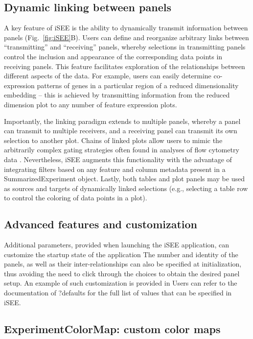\documentclass[10pt,a4paper,twocolumn]{article}
\begin{document}
\subsection*{Dynamic linking between panels}
A key feature of iSEE is the ability to dynamically transmit information between panels (Fig.~\ref{fig:iSEE}B).
Users can define and reorganize arbitrary links between ``transmitting'' and ``receiving'' panels, whereby selections in transmitting panels control the inclusion and appearance of the corresponding data points in receiving panels.
This feature facilitates exploration of the relationships between different aspects of the data.
For example, users can easily determine co-expression patterns of genes in a particular region of a reduced dimensionality embedding -- this is achieved by transmitting information from the reduced dimension plot to any number of feature expression plots.

Importantly, the linking paradigm extends to multiple panels, whereby a panel can transmit to multiple receivers, and a receiving panel can transmit its own selection to another plot.
Chains of linked plots allow users to mimic the arbitrarily complex gating strategies often found in analyses of flow cytometry data \citep{finak2014opencyto}.
Nevertheless, iSEE augments this functionality with the advantage of integrating filters based on any feature and column metadata present in a SummarizedExperiment object.
Lastly, both tables and plot panels may be used as sources and targets of dynamically linked selections (e.g., selecting a table row to control the coloring of data points in a plot).

\subsection*{Advanced features and customization}

Additional parameters, provided when launching the iSEE application, can customize the startup state of the application
The number and identity of the panels, as well as their inter-relationships can also be specified at initialization, thus avoiding the need to click through the choices to obtain the desired panel setup.
An example of such customization is provided in %
Users can refer to the documentation of ?defaults for the full list of values that can be specified in iSEE.


\subsection*{ExperimentColorMap: custom color maps}
\end{document}
